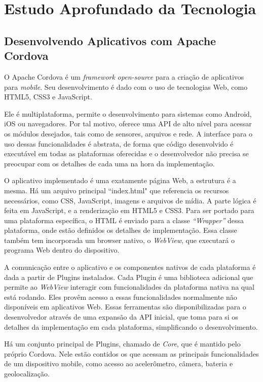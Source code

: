 \documentclass[a4paper,12pt]{article}
\begin{document}
\newpage

\section{Estudo Aprofundado da Tecnologia}

\subsection{Desenvolvendo Aplicativos com Apache Cordova}

O Apache Cordova é um \emph{framework} \emph{open-source} para a criação de aplicativos para \emph{mobile}. Seu desenvolvimento é dado com o uso de tecnologias Web, como HTML5, CSS3 e JavaScript.

Ele é multiplataforma, permite o desenvolvimento para sistemas como Android, iOS ou navegadores. Por tal motivo, oferece uma API de alto nível para acessar os módulos desejados, tais como de sensores, arquivos e rede. A interface para o uso dessas funcionalidades é abstrata, de forma que código desenvolvido é executável em todas as plataformas oferecidas e o desenvolvedor não precisa se preocupar com os detalhes de cada uma na hora da implementação.

O aplicativo implementado é uma exatamente página Web, a estrutura é a mesma. Há um arquivo principal “index.html" que referencia os recursos necessários, como CSS, JavaScript, imagens e arquivos de mídia. A parte lógica é feita em JavaScript, e a renderização em HTML5 e CSS3. Para ser portado para uma plataforma específica, o HTML é enviado para a classe \emph{“Wrapper”} dessa plataforma, onde estão definidos os detalhes de implementação. Essa classe também tem incorporada um browser nativo, o \emph{WebView}, que executará o programa Web dentro do dispositivo.

A comunicação entre o aplicativo e os componentes nativos de cada plataforma é dada a partir de Plugins instalados. Cada Plugin é uma biblioteca adicional que permite ao \emph{WebView} interagir com funcionalidades da plataforma nativa na qual está rodando. Eles provêm acesso a essas funcionalidades normalmente não disponíveis em aplicativos Web. Essas ferramentas são disponibilizadas para o desenvolvedor através de uma expansão da API inicial, que toma para si os detalhes da implementação em cada plataforma, simplificando o desenvolvimento.

Há um conjunto principal de Plugins, chamado de \emph{Core}, que é mantido pelo próprio Cordova. Nele estão contidos os que acessam as principais funcionalidades de um dispositivo mobile, como acesso ao acelerômetro, câmera, bateria e geolocalização.
\end{document}
